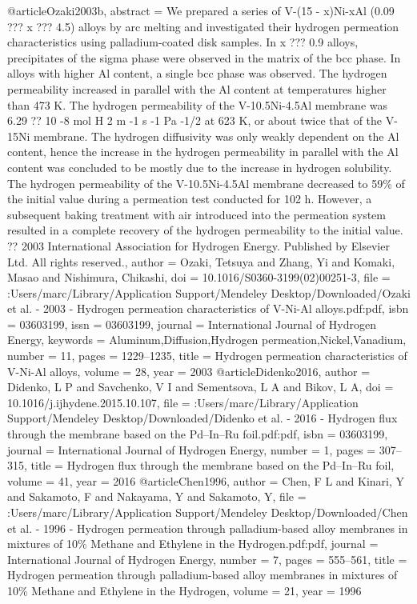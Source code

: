 @article{Ozaki2003b,
abstract = {We prepared a series of V-(15 - x)Ni-xAl (0.09 ??? x ??? 4.5) alloys by arc melting and investigated their hydrogen permeation characteristics using palladium-coated disk samples. In x ??? 0.9 alloys, precipitates of the sigma phase were observed in the matrix of the bcc phase. In alloys with higher Al content, a single bcc phase was observed. The hydrogen permeability increased in parallel with the Al content at temperatures higher than 473 K. The hydrogen permeability of the V-10.5Ni-4.5Al membrane was 6.29 ?? 10
                        -8 mol H
                        2 m
                        -1 s
                        -1 Pa
                        -1/2 at 623 K, or about twice that of the V-15Ni membrane. The hydrogen diffusivity was only weakly dependent on the Al content, hence the increase in the hydrogen permeability in parallel with the Al content was concluded to be mostly due to the increase in hydrogen solubility. The hydrogen permeability of the V-10.5Ni-4.5Al membrane decreased to 59{\%} of the initial value during a permeation test conducted for 102 h. However, a subsequent baking treatment with air introduced into the permeation system resulted in a complete recovery of the hydrogen permeability to the initial value. ?? 2003 International Association for Hydrogen Energy. Published by Elsevier Ltd. All rights reserved.},
author = {Ozaki, Tetsuya and Zhang, Yi and Komaki, Masao and Nishimura, Chikashi},
doi = {10.1016/S0360-3199(02)00251-3},
file = {:Users/marc/Library/Application Support/Mendeley Desktop/Downloaded/Ozaki et al. - 2003 - Hydrogen permeation characteristics of V-Ni-Al alloys.pdf:pdf},
isbn = {03603199},
issn = {03603199},
journal = {International Journal of Hydrogen Energy},
keywords = {Aluminum,Diffusion,Hydrogen permeation,Nickel,Vanadium},
number = {11},
pages = {1229--1235},
title = {{Hydrogen permeation characteristics of V-Ni-Al alloys}},
volume = {28},
year = {2003}
}
@article{Didenko2016,
author = {Didenko, L P and Savchenko, V I and Sementsova, L A and Bikov, L A},
doi = {10.1016/j.ijhydene.2015.10.107},
file = {:Users/marc/Library/Application Support/Mendeley Desktop/Downloaded/Didenko et al. - 2016 - Hydrogen flux through the membrane based on the Pd–In–Ru foil.pdf:pdf},
isbn = {03603199},
journal = {International Journal of Hydrogen Energy},
number = {1},
pages = {307--315},
title = {{Hydrogen flux through the membrane based on the Pd–In–Ru foil}},
volume = {41},
year = {2016}
}
@article{Chen1996,
author = {Chen, F L and Kinari, Y and Sakamoto, F and Nakayama, Y and Sakamoto, Y},
file = {:Users/marc/Library/Application Support/Mendeley Desktop/Downloaded/Chen et al. - 1996 - Hydrogen permeation through palladium-based alloy membranes in mixtures of 10{\%} Methane and Ethylene in the Hydrogen.pdf:pdf},
journal = {International Journal of Hydrogen Energy},
number = {7},
pages = {555--561},
title = {{Hydrogen permeation through palladium-based alloy membranes in mixtures of 10{\%} Methane and Ethylene in the Hydrogen}},
volume = {21},
year = {1996}
}
